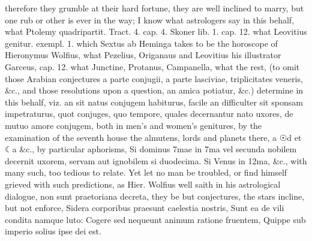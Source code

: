 {therefore they grumble at their hard fortune, they are well inclined to
marry, but one rub or other is ever in the way; I know what astrologers
say in this behalf, what Ptolemy quadripartit. Tract. 4. cap. 4. Skoner
lib. 1. cap. 12. what Leovitius genitur. exempl. 1. which Sextus ab
Heminga takes to be the horoscope of Hieronymus Wolfius, what Pezelius,
Origanaus and Leovitius his illustrator Garceus, cap. 12. what
Junctine, Protanus, Campanella, what the rest, (to omit those Arabian
conjectures a parte conjugii, a parte lasciviae, triplicitates veneris,
\&c., and those resolutions upon a question, an amica potiatur, \&c.)
determine in this behalf, viz. an sit natus conjugem habiturus, facile
an difficulter sit sponsam impetraturus, quot conjuges, quo tempore,
quales decernantur nato uxores, de mutuo amore conjugem, both in men's
and women's genitures, by the examination of the seventh house the
almutens, lords and planets there, a ☉d et ☾a \&c., by particular
aphorisms, Si dominus 7mae in 7ma vel secunda nobilem decernit uxorem,
servam aut ignobilem si duodecima. Si Venus in 12ma, \&c., with many
such, too tedious to relate. Yet let no man be troubled, or find
himself grieved with such predictions, as Hier. Wolfius well saith in
his astrological dialogue, non sunt praetoriana decreta, they be
but conjectures, the stars incline, but not enforce,
Sidera corporibus praesunt caelestia nostris,
Sunt ea de vili condita namque luto:
Cogere sed nequeunt animum ratione fruentem,
Quippe sub imperio solius ipse dei est.

}
